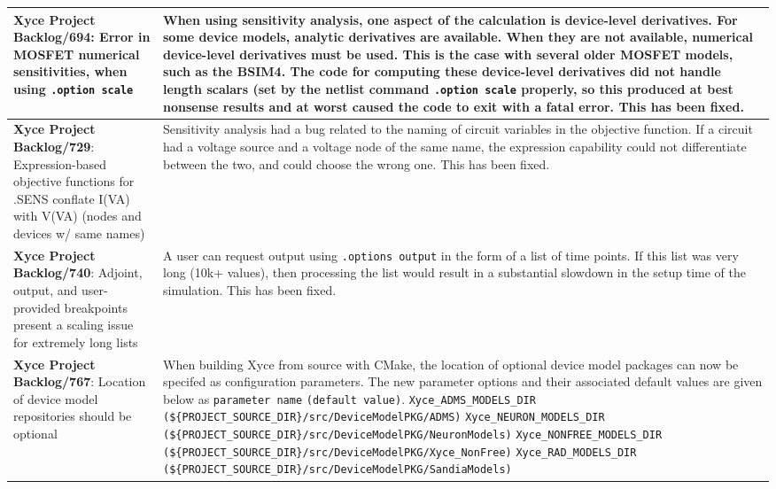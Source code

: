 {\begin{longtable}[h] {>{\raggedright\small}m{2in}|>{\raggedright\let\\\tabularnewline\small}m{3.5in}}
\textbf{Xyce Project Backlog/694}: 
Error in MOSFET numerical sensitivities, when using \texttt{.option scale}
  & When using sensitivity analysis, one aspect of the calculation is device-level derivatives.  For some device models, analytic derivatives are available.  When they are not available, numerical device-level derivatives must be used.  This is the case with several older MOSFET models, such as the BSIM4.  The code for computing these device-level derivatives did not handle length scalars (set by the netlist command \texttt{.option scale} properly, so this produced at best nonsense results and at worst caused the code to exit with a fatal error.  This has been fixed. \\ \hline

\textbf{Xyce Project Backlog/729}: 
Expression-based objective functions for .SENS conflate I(VA) with V(VA) (nodes and devices w/ same names)
& Sensitivity analysis had a bug related to the naming of circuit variables in the objective function.
If a circuit had a voltage source and a voltage node of the same name, the expression capability could not differentiate between the two, and could choose the wrong one.  This has been fixed. \\ \hline

\textbf{Xyce Project Backlog/740}: Adjoint, output, and user-provided breakpoints present a scaling issue for
extremely long lists & A user can request output using \texttt{.options output}
in the form of a list of time points.  If this list was very long (10k+ values),
then processing the list would result in a substantial slowdown in the setup time of the 
simulation.  This has been fixed. \\ \hline

\textbf{Xyce Project Backlog/767}: Location of device model repositories 
should be optional & When building Xyce from source with CMake, the 
location of optional device model packages can now be specifed as 
configuration parameters. The new parameter options and their 
associated default values are given below as \texttt{parameter name} 
\texttt{(default value)}. \newline
\texttt{Xyce\_ADMS\_MODELS\_DIR} \texttt{(\$\{PROJECT\_SOURCE\_DIR\}/src/DeviceModelPKG/ADMS)} \newline
\texttt{Xyce\_NEURON\_MODELS\_DIR} \texttt{(\$\{PROJECT\_SOURCE\_DIR\}/src/DeviceModelPKG/NeuronModels)} \newline
\texttt{Xyce\_NONFREE\_MODELS\_DIR} \texttt{(\$\{PROJECT\_SOURCE\_DIR\}/src/DeviceModelPKG/Xyce\_NonFree)} \newline
\texttt{Xyce\_RAD\_MODELS\_DIR} \texttt{(\$\{PROJECT\_SOURCE\_DIR\}/src/DeviceModelPKG/SandiaModels)} \newline
\\ \hline


\end{longtable}}
